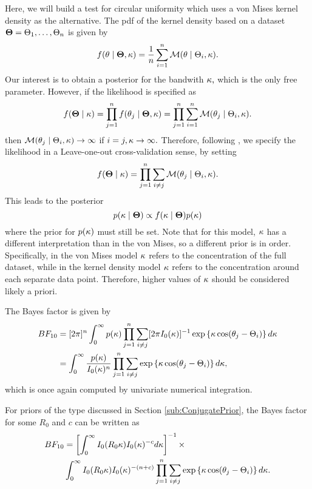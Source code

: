 Here, we will build a test for circular uniformity which uses a von Mises kernel density as the alternative. The pdf of the kernel density based on a dataset \( \boldsymbol{\Theta} = \Theta_1, \dots, \Theta_n \) is given by
\begin{equation}
  f (\theta \mid \boldsymbol{\Theta}, \kappa) = \frac{1}{n} \sum_{i = 1}^n \mathcal{M} (\theta \mid \Theta_i, \kappa).
\end{equation}
Our interest is to obtain a posterior for the bandwith \( \kappa, \) which is the only free parameter. However, if the likelihood is specified as
\begin{equation}
 f(\boldsymbol{\Theta} \mid \kappa) = \prod_{j = 1}^n f (\theta_j \mid \boldsymbol{\Theta}, \kappa) = \prod_{j = 1}^n \sum_{i = 1}^n \mathcal{M} (\theta_j \mid \Theta_i, \kappa).
\end{equation}
then \( \mathcal{M} (\theta_j \mid \Theta_i, \kappa) \rightarrow \infty \) if \( i = j, \kappa \rightarrow \infty. \) Therefore, following \citet{hall1987kernel}, we specify the likelihood in a Leave-one-out cross-validation sense, by setting
\begin{equation}
  f(\boldsymbol{\Theta} \mid \kappa) = \prod_{j = 1}^n \sum_{i \neq j } \mathcal{M} (\theta_j \mid \Theta_i, \kappa).
\end{equation}
This leads to the posterior
\begin{equation}
  p(\kappa \mid \boldsymbol{\Theta}) \propto f(\kappa \mid \boldsymbol{\Theta}) p(\kappa)
\end{equation}
where the prior for \( p(\kappa) \) must still be set. Note that for this model, \( \kappa \) has a different interpretation than in the von Mises, so a different prior is in order. Specifically, in the von Mises model \( \kappa \) refers to the concentration of the full dataset, while in the kernel density model \( \kappa \) refers to the concentration around each separate data point. Therefore, higher values of \( \kappa \) should be considered likely a priori.

The Bayes factor is given by
\begin{align}
  BF_{10} &= [2 \pi]^n \int_0^{\infty} p(\kappa) \prod_{j = 1}^n \sum_{i \neq j } [2 \pi I_0 (\kappa)]^{-1} \exp \left\{ \kappa \cos(\theta_j - \Theta_i) \right\} d\kappa \\
           &=  \int_0^{\infty}  \frac{p(\kappa)}{I_0(\kappa)^n} \prod_{j = 1}^n \sum_{i \neq j }  \exp \left\{ \kappa \cos(\theta_j - \Theta_i) \right\} d\kappa,
\end{align}
which is once again computed by univariate numerical integration.

For priors of the type discussed in Section \ref{sub:ConjugatePrior}, the Bayes factor for some \( R_0\) and \(c\) can be written as
\begin{align}
 BF_{10} &= \left[ \int_0^{\infty} I_0(R_0 \kappa) I_0(\kappa)^{-c} d\kappa \right]^{-1} \times \\ &\int_0^{\infty} I_0(R_0 \kappa) I_0(\kappa)^{-(n+c)} \prod_{j = 1}^n \sum_{i \neq j }  \exp \left\{ \kappa \cos(\theta_j - \Theta_i) \right\} d\kappa.
\end{align}


